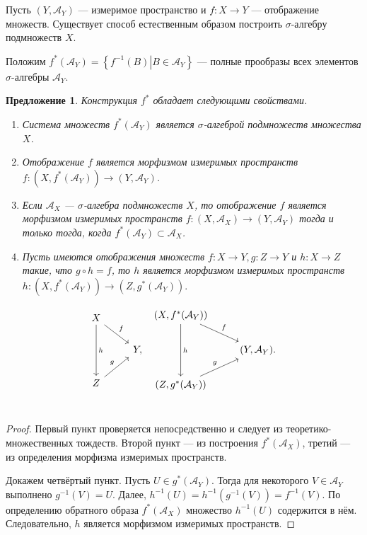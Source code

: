 \documentclass[12pt]{article}
\newtheorem{proposition}[theorem]{Предложение}
\numberwithin{theorem}{section}
\theoremstyle{definition}
\newcommand{\calA}{\mathcal{A}}
\newcommand{\defineset}[2]{\left\{
	\left.
	#1
	\right\vert
	#2
	\right\}}
\begin{document}
	Пусть $ (Y, \calA_Y) $ --- измеримое пространство и $ f \colon X \to Y $ --- отображение множеств.
	Существует способ естественным образом построить $ \sigma $-алгебру подмножеств $ X $.
	
	Положим $ f^{*}(\calA_Y) = \defineset{f^{-1}(B)}{B \in \calA_Y} $ --- полные прообразы всех элементов $ \sigma $-алгебры $ \calA_Y $.
	
	\begin{proposition} \label{inverse image of sigma algebra}
		Конструкция $ f^{*} $ обладает следующими свойствами.
		\begin{enumerate}
			\item Система множеств $ f^{*}(\calA_Y) $ является $ \sigma $-алгеброй подмножеств множества $ X $.
			\item Отображение $ f $ является морфизмом измеримых пространств $ f \colon (X, f^{*}(\calA_Y)) \to (Y, \calA_Y) $.
			\item Если $ \calA_X $ --- $ \sigma $-алгебра подмножеств $ X $,
			то отображение $ f $ является морфизмом измеримых пространств $ f \colon (X, \calA_X) \to (Y, \calA_Y) $
			тогда и только тогда, когда $ f^{*}(\calA_Y) \subset \calA_X $.
			\item Пусть имеются отображения множеств $ f \colon X \to Y, g \colon Z \to Y $ и $ h \colon X \to Z $
			такие, что $ g \circ h = f $, то $ h $ является морфизмом измеримых пространств
			$ h \colon (X, f^{*}(\calA_Y)) \to (Z, g^{*}(\calA_Y)). $
		\end{enumerate}
		$$ \begin{tikzcd}
			X \ar{dd}{h} \ar{dr}{f} & \\
			& Y, \\
			Z \ar{ur}{g} & \\
		\end{tikzcd} \
		\begin{tikzcd}
			(X, f^{*}(\calA_Y)) \ar{dd}{h} \ar{dr}{f} & \\
			 & (Y, \calA_Y).  \\
			(Z, g^{*}(\calA_Y)) \ar{ur}{g} &  \\
		\end{tikzcd} $$
	\end{proposition}
	
	\begin{proof}
		Первый пункт проверяется непосредственно и следует из теоретико-множественных тождеств.
		Второй пункт --- из построения $ f^{*}(\calA_X) $, третий --- из определения морфизма измеримых пространств.
		
		Докажем четвёртый пункт. Пусть $ U \in g^*(\calA_Y) $. Тогда для некоторого $ V \in \calA_Y $ выполнено $ g^{-1}(V) = U $. Далее, $ h^{-1}(U) = h^{-1}(g^{-1}(V)) = f^{-1}(V) $.
		По определению обратного образа $ f^*(\calA_X) $ множество $ h^{-1}(U) $ содержится в нём.
		Следовательно, $ h $ является морфизмом измеримых пространств.
	\end{proof}
	
\end{document}
